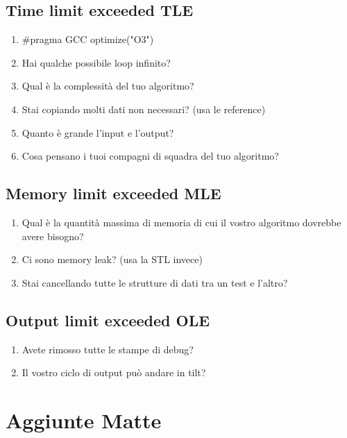 \documentclass{article}
\begin{document}
\subsection{Time limit exceeded TLE}
\begin{enumerate}
    \item $\#$pragma GCC optimize("O3")
    \item Hai qualche possibile loop infinito?
    \item Qual è la complessità del tuo algoritmo?
    \item Stai copiando molti dati non necessari? (usa le reference)
    \item Quanto è grande l'input e l'output?
    \item Cosa pensano i tuoi compagni di squadra del tuo algoritmo?
\end{enumerate}

\subsection{Memory limit exceeded MLE}
\begin{enumerate}
    \item Qual è la quantità massima di memoria di cui il vostro algoritmo dovrebbe avere bisogno?
    \item Ci sono memory leak? (usa la STL invece)
    \item Stai cancellando tutte le strutture di dati tra un test e l'altro?
\end{enumerate}

\subsection{Output limit exceeded OLE}
\begin{enumerate}
    \item Avete rimosso tutte le stampe di debug?
    \item Il vostro ciclo di output può andare in tilt?
\end{enumerate}

\section{Aggiunte Matte}
\end{document}
